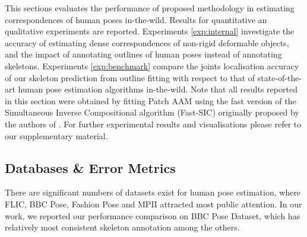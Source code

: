 This sections evaluates the performance of proposed methodology in estimating correspondences of human poses in-the-wild. Results for quantitative an qualitative experiments are reported. Experiments \ref{exp:internal} investigate the accuracy of estimating dense correspondences of non-rigid deformable objects, and the impact of annotating outlines of human poses instead of annotating skeletons. Experiments \ref{exp:benchmark} compare the joints localisation accuracy of our skeleton prediction from outline fitting with respect to that of state-of-the-art human pose estimation algorithms in-the-wild. Note that all results reported in this section were obtained by fitting Patch AAM using the fast version of the Simultaneous Inverse Compositional algorithm (Fast-SIC) originally proposed by the authors of \cite{Papandreou2008}. For further experimental results and visualisations please refer to our supplementary material.


\subsection{Databases \& Error Metrics}
There are significant numbers of datasets exist for human pose estimation, where FLIC\cite{sapp2013modec}, BBC Pose\cite{pfister2015flowing}, Fashion Pose\cite{dantone2013human} and MPII\cite{andriluka14cvpr} attracted most public attention. In our work, we reported our performance comparison on BBC Pose Dataset\cite{pfister2015flowing}, which has relatively most consistent skeleton annotation among the others.

